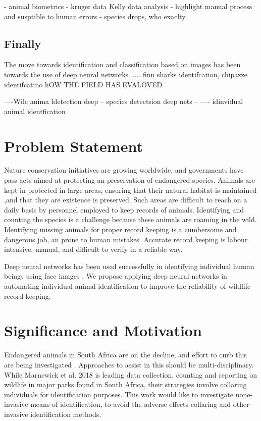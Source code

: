 - animal biometrics
- kruger data Kelly data analysis
- highlight manual process and susptible to human errors 
- species drops, who exaclty. 

\subsection{Finally}
The move towards identification and classification based on images has been towards the use of deep neural networks.  \cite{hughes2017automated}  .... finn sharks identifcation,
chipazze identifcatino \cite{loos2013automated}
hOW THE FIELD HAS EVALOVED \cite{weinstein2018computer}

----Wilc anima ldetection  deep  \cite{verma2018wild}
-- species detectsion deep nets -- 
---- idinvidual animal identfication \cite{schneider2019similarity}

\section{Problem Statement}
Nature conservation initiatives are growing worldwide, and governments have pass acts aimed at protecting an preservation of endangered species. Animals are kept in protected in large areas, ensuring that their natural habitat is maintained ,and that they are existence is preserved. 
Such areas are difficult to reach on a daily basis by personnel employed to keep records of animals. Identifying and counting the species is a challenge because these animals are roaming in the wild. Identifying missing animals for proper record keeping is a cumbersome and dangerous job, an prone to human mistakes. Accurate record keeping is labour intensive, manual, and difficult to verify in a reliable way.  

Deep neural networks has been used successfully in identifying individual human beings using face images \cite{parkhi2015deep} \cite{schroff2015facenet}. We propose applying deep neural networks in automating individual animal identification to improve the reliability of wildlife record keeping. 

\section{Significance and Motivation}
Endangered  animals in South Africa are on the decline, and effort to curb this are being investigated \cite{marnewick2008evaluating}. Approaches to assist in this should be  multi-disciplinary. While Marnewick et al. 2018 \cite{marnewick2018cheetaprob} is leading data collection, counting and reporting on wildlife in major parks found in South Africa, their strategies involve collaring individuals for identification purposes. 
This work would like to investigate none-invasive means of identification, to avoid the adverse effects collaring and other invasive identification methods. 

